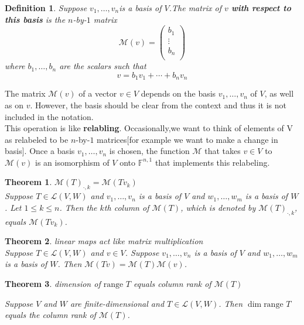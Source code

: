 \documentclass{article}
\newtheorem{theorem}{Theorem}[subsection]
\newtheorem{definition}{Definition}[subsection]
\newcommand{\FF}{\mathbb{F}}
\begin{document}
\begin{CJK}{UTF8}{gkai}
\begin{definition}
 Suppose $v_1,\ldots,v_n$is a basis of $V$.The matrix of $v$ \textbf{with respect to this basis} is the $n$-by-$1$ matrix
    \[\mathcal{M}(v) = \begin{pmatrix}
        b_1\\
        \vdots\\
        b_n\\
    \end{pmatrix}\]
 where $b_1,\ldots,b_n$ are the scalars such that
 \[v=b_1v_1+\cdots+b_n v_n\]
\end{definition}
The matrix $\mathcal{M}(v)$ of a vector $v \in V$ depends on the basis $v_1,\ldots,v_n$ of $V$, as well as on $v$. However, the basis should be clear from the context and thus it is not included in the notation.\\

This operation is like \textbf{relabling}. Occasionally,we want to think of elements of V as relabeled to be $n$-by-$1$ matrices[for example we want to make a change in basis]. Once a basis $v_1,\ldots,v_n$ is chosen, the function $\mathcal{M}$ that takes $v\in V$ to $\mathcal{M}(v)$ is an isomorphism of $V$ onto $\FF^{n,1}$ that implements this relabeling.\\

\begin{theorem}
    $\mathcal{M}(T)_{\cdot,k} = \mathcal{M}(Tv_k)$\\

    Suppose $T \in \mathcal{L}(V,W)$ and $v_1,\ldots,v_n$ is a basis of $V$ and $w_1,\ldots,w_m$ is a basis of $W$. Let $1 \leq k \leq n$. Then the $k$th column of $\mathcal{M}(T)$, which is denoted by $\mathcal{M}(T)_{\cdot,k} $, equals $\mathcal{M}(Tv_k)$.\\
\end{theorem}

\begin{theorem}
    linear maps act like matrix multiplication\\

    Suppose $T \in \mathcal{L}(V,W)$ and $v \in V$. Suppose $v_1,\ldots,v_n$ is a basis of $V$ and $w_1,\ldots,w_m$ is a basis of $W$. Then $\mathcal{M}(Tv) = \mathcal{M}(T)\mathcal{M}(v)$.\\
\end{theorem}

\begin{theorem}
    dimension of $\text{range~} T$ equals column rank of $\mathcal{M}(T)$

 Suppose $V$ and $W$ are finite-dimensional and $T \in \mathcal{L}(V,W)$. Then $\dim \text{range~}T$ equals the column rank of $\mathcal{M}(T)$.
\end{theorem}


\end{CJK}
\end{document}
